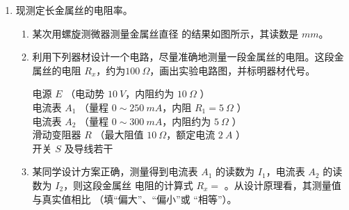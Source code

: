 \begin{enumerate}
\item 
{}
现测定长金属丝的电阻率。
\begin{enumerate}
\item
某次用螺旋测微器测量金属丝直径 的结果如图所示，其读数是 \underlinegap $ mm $。
\begin{figure}[h!]
\centering

\end{figure}

\item 
利用下列器材设计一个电路，尽量准确地测量一段金属丝的电阻。这段金属丝的电阻 $ R_{x} $，约为$ 100 \ \Omega $，画出实验电路图，并标明器材代号。

电源 $ E $ \quad （电动势 $ 10 \ V $，内阻约为 $ 10 \ \Omega $ ）\\
电流表 $ A_{1} $ \quad （量程 $ 0 \sim 250 \ mA $，内阻 $ R_{1} =5 \ \Omega $ ）\\
电流表 $ A_{2} $ \quad （量程 $ 0 \sim 300 \ mA $，内阻约为 $ 5 \ \Omega $ ）\\
滑动变阻器 $ R $ \quad （最大阻值 $ 10 \ \Omega $，额定电流 $ 2 \ A $ ）\\
开关 $ S $ 及导线若干

\item 
某同学设计方案正确，测量得到电流表 $ A_{1} $ 的读数为 $ I_{1} $，电流表 $ A_{2} $ 的读数为 $ I_{2} $，则这段金属丝
电阻的计算式 $ R_{x} = $ \underlinegap 。从设计原理看，其测量值与真实值相比 \underlinegap （填“偏大”、“偏小”或
“相等”）。




\end{enumerate}






\end{enumerate}

